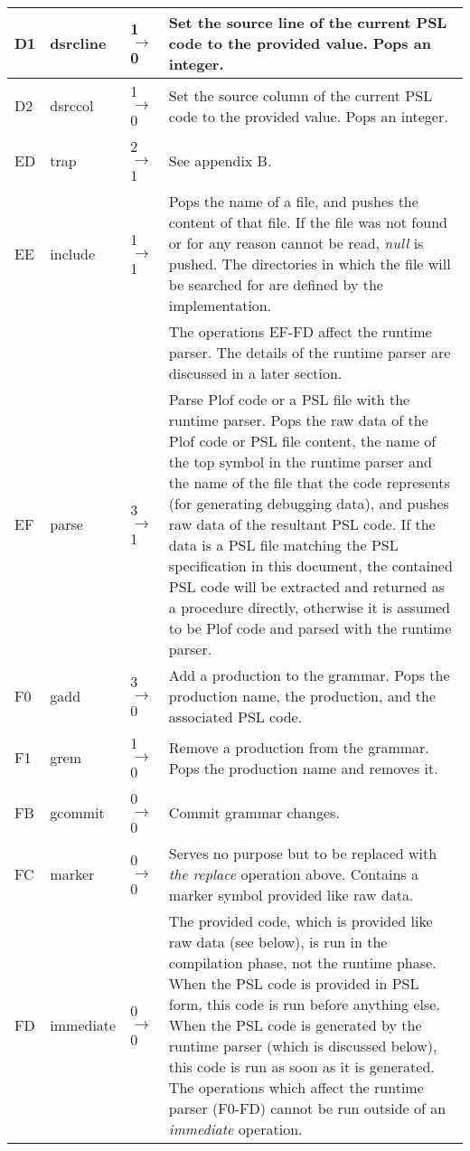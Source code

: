 \begin{longtable}{ | l | l | l | X | }
\hline
D1 & dsrcline & 1 $\rightarrow$ 0 & Set the source line of the current PSL code to the provided value. Pops an integer. \\
\hline
D2 & dsrccol & 1 $\rightarrow$ 0 & Set the source column of the current PSL code to the provided value. Pops an integer. \\
\hline
ED & trap & 2 $\rightarrow$ 1 & See appendix B. \\
\hline
EE & include & 1 $\rightarrow$ 1 & Pops the name of a file, and pushes the content of that file. If the file was not found or for any reason cannot be read, \textit{null} is pushed. The directories in which the file will be searched for are defined by the implementation. \\
\hline
  &   &   & The operations EF-FD affect the runtime parser. The details of the runtime parser are discussed in a later section. \\
\hline
EF & parse & 3 $\rightarrow$ 1 & Parse Plof code or a PSL file with the runtime parser. Pops the raw data of the Plof code or PSL file content, the name of the top symbol in the runtime parser and the name of the file that the code represents (for generating debugging data), and pushes raw data of the resultant PSL code. If the data is a PSL file matching the PSL specification in this document, the contained PSL code will be extracted and returned as a procedure directly, otherwise it is assumed to be Plof code and parsed with the runtime parser. \\
\hline
F0 & gadd & 3 $\rightarrow$ 0 & Add a production to the grammar. Pops the production name, the production, and the associated PSL code. \\
\hline
F1 & grem & 1 $\rightarrow$ 0 & Remove a production from the grammar. Pops the production name and removes it. \\
\hline
FB & gcommit & 0 $\rightarrow$ 0 & Commit grammar changes. \\
\hline
FC & marker & 0 $\rightarrow$ 0 & Serves no purpose but to be replaced with \textit{the replace }operation above. Contains a marker symbol provided like raw data. \\
\hline
FD & immediate & 0 $\rightarrow$ 0 & The provided code, which is provided like raw data (see below), is run in the compilation phase, not the runtime phase. When the PSL code is provided in PSL form, this code is run before anything else. When the PSL code is generated by the runtime parser (which is discussed below), this code is run as soon as it is generated. The operations which affect the runtime parser (F0-FD) cannot be run outside of an \textit{immediate} operation. \\

\end{longtable}
